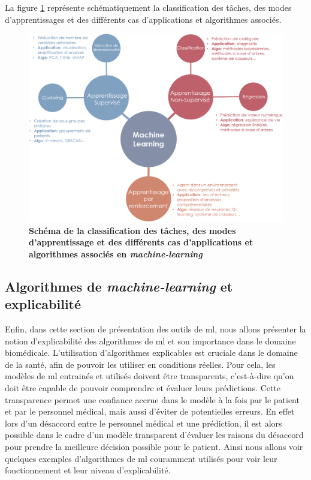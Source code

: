 La figure \ref{fig:ml-landscape} représente schématiquement la classification des tâches, des modes d'apprentissages et des différents cas d'applications et algorithmes associés.
\begin{figure}[!ht]
 \centering
 \includegraphics[width=1\textwidth]{figures/ml_landscape.png}
 \caption[Schéma des méthodes de machine-learning]{\textbf{Schéma de la classification des tâches, des modes d'apprentissage et des différents cas d'applications et algorithmes associés en \textit{machine-learning}}}
 \label{fig:ml-landscape}
\end{figure}

\subsection{Algorithmes de \textit{machine-learning} et explicabilité}\label{xai-sec}
Enfin, dans cette section de présentation des outils de \gls{ml}, nous allons présenter la notion d'explicabilité des algorithmes de \gls{ml} et son importance dans le domaine biomédicale. L'utilisation d'algorithmes explicables est cruciale dans le domaine de la santé, afin de pouvoir les utiliser en conditions réelles. Pour cela, les modèles de \gls{ml} entrainés et utilisés doivent être transparents, c'est-à-dire qu'on doit être capable de pouvoir comprendre et évaluer leurs prédictions. Cette transparence permet une confiance accrue dans le modèle à la fois par le patient et par le personnel médical, mais aussi d'éviter de potentielles erreurs. En effet lors d'un désaccord entre le personnel médical et une prédiction, il est alors possible dans le cadre d'un modèle transparent d'évaluer les raisons du désaccord pour prendre la meilleure décision possible pour le patient. Ainsi nous allons voir quelques exemples d'algorithmes de \gls{ml} couramment utilisés pour voir leur fonctionnement et leur niveau d'explicabilité.

